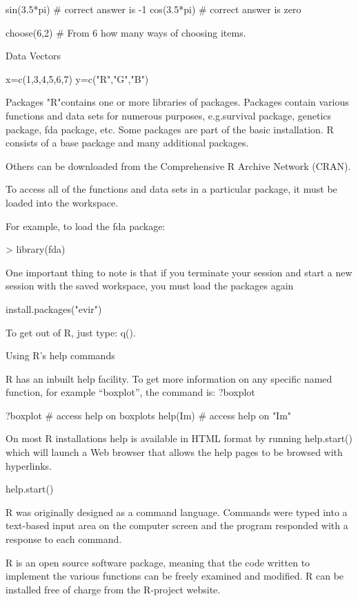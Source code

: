 sin(3.5*pi)             # correct answer is -1
cos(3.5*pi)             # correct answer is zero
 
choose(6,2)             # From 6 how many ways of choosing items.
 
Data Vectors

x=c(1,3,4,5,6,7)
y=c("R","G","B")

 




Packages
"R"contains one or more libraries of packages. Packages contain various functions and data sets for numerous purposes, e.g.survival package, genetics package, fda package, etc. Some packages are part of the basic installation. 
R consists of a base package and many additional packages.

Others can be downloaded from the Comprehensive R Archive Network (CRAN).

To access all of the functions and data sets in a particular package, it must be loaded into the workspace. 

For example, to load the fda package:

> library(fda)

One important thing to note is that if you terminate your session and start a new session with the saved workspace, you must load  the packages again



install.packages("evir")
 
To get out of R, just type: q(). 

Using R's help commands

R has an inbuilt help facility. To get more information on any specific named function, for example “boxplot”, the command is: ?boxplot


?boxplot		# access help on boxplots
help(Im)        # access help on "Im"


On most R installations help is available in HTML format by running help.start() which will launch a Web browser that allows the help pages to be browsed with hyperlinks. 
 



help.start()

 
 

R was originally designed as a command language.  
Commands were typed into a text-based input area on the computer screen and the program responded with a response to each command.

R is an open source software package, meaning that the code written to implement the various functions can be freely examined and modified.
R can be installed free of charge from the R-project website.

